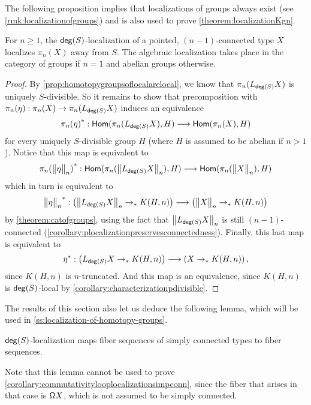 The following proposition implies that localizations of groups always exist
(see \cref{rmk:localizationofgroups})
and is also used to prove \cref{theorem:localizationKgn}.

\begin{prp}\label{lemma:localizationlocalizesfirst}
    For $n \geq 1$,
    the $\degg(S)$-localization of a pointed, $(n-1)$-connected type $X$ localizes $\pi_n(X)$ away from $S$.
    The algebraic localization takes place in the category of groups if $n = 1$ and
    abelian groups otherwise.
\end{prp}

\begin{proof}
    By \cref{prop:homotopygroupsoflocalarelocal},
    we know that $\pi_n(L_{\degg(S)} X)$ is uniquely $S$-divisible.
    So it remains to show that precomposition with $\pi_n(\eta) : \pi_n(X) \to \pi_n(L_{\degg(S)} X)$
    induces an equivalence
    \[
        \precomp{\pi_n(\eta)} : \Hom(\pi_n(L_{\degg(S)} X),  H) \lra \Hom(\pi_n(X), H)
    \]
    for every uniquely $S$-divisible group $H$ (where $H$ is assumed to be abelian if $n>1$).
    Notice that this map is equivalent to 
    \[
        \precomp{\pi_n(\ttrunc{n}{\eta})} : \Hom(\pi_n(\ttrunc{n}{L_{\degg(S)} X}),  H) \lra \Hom(\pi_n(\ttrunc{n}{X}), H)
    \]
    which in turn is equivalent to
    \[
        \precomp{\ttrunc{n}{\eta}} : \left( \ttrunc{n}{L_{\degg(S)}X} \pto K(H, n) \right) \lra \left( \ttrunc{n}{X} \pto K(H, n) \right) 
    \]
    by \cref{theorem:catofgroups}, using the fact that $\ttrunc{n}{L_{\degg(S)}X}$ is still $(n-1)$-connected (\cref{corollary:plocalizationpreservesconnectedness}).
    Finally, this last map is equivalent to
    \[
        \precomp{\eta} : \left( L_{\degg(S)}X \pto K(H, n) \right) \lra \left( X \pto K(H, n) \right),
    \]
    since $K(H,n)$ is $n$-truncated.
    And this map is an equivalence, since $K(H,n)$ is $\degg(S)$-local by \cref{corollary:characterizationpdivisible}.
\end{proof}

The results of this section also let us deduce the following lemma,
which will be used in \cref{ss:localization-of-homotopy-groups}.

\begin{lem}\label{lemma:lex}
    $\degg(S)$-localization maps fiber sequences of simply connected types to fiber sequences.
\end{lem}

Note that this lemma cannot be used to prove \cref{corollary:commutativitylooplocalizationsimpconn},
since the fiber that arises in that case is $\loopspacesym X$, which is not assumed to be
simply connected.

